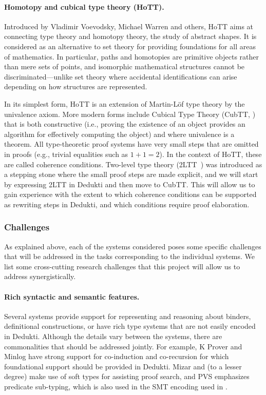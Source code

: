 \paragraph*{Homotopy and cubical type theory (HoTT).}
Introduced by Vladimir Voevodsky, Michael Warren and others, HoTT aims at
connecting type theory and homotopy theory, the study of abstract shapes. It is
considered as an alternative to set theory for providing foundations for all
areas of mathematics. In particular, paths and homotopies are primitive objects
rather than mere sets of points, and isomorphic mathematical structures cannot
be discriminated---unlike set theory where accidental identifications can arise
depending on how structures are represented.

In its simplest form, HoTT is an extension of Martin-L\"of type theory by the
univalence axiom. More modern forms include Cubical Type Theory (CubTT,
\cite{cohen:cubical}) that is both constructive (i.e., proving the existence of
an object provides an algorithm for effectively computing the object) and where
univalence is a theorem. All type-theoretic proof systems have very small steps
that are omitted in proofs (e.g., trivial equalities such as $1+1=2$). In the
context of HoTT, these are called coherence conditions. Two-level type theory
(2LTT~\cite{annenkov:two-level}) was introduced as a stepping stone where the
small proof steps are made explicit, and we will start by expressing 2LTT in
Dedukti and then move to CubTT. This will allow us to gain experience with
the extent to which coherence conditions can be supported as rewriting steps in
Dedukti, and which conditions require proof elaboration.

\subsubsection*{Challenges}

As explained above, each of the systems considered poses some specific
challenges that will be addressed in the tasks corresponding to the
individual systems. We list some cross-cutting research challenges
that this project will allow us to address synergistically.

\paragraph*{Rich syntactic and semantic features.}
Several systems provide support for representing and reasoning about
binders, definitional constructions, or have rich type systems that
are not easily encoded in Dedukti.  Although the details vary between the systems,
there are commonalities that should be addressed jointly. For example,
K Prover and Minlog have strong support for co-induction and co-recursion
for which foundational support should be provided in Dedukti. Mizar
and (to a lesser degree) \tlaplus make use of soft types for assisting
proof search, and PVS emphasizes predicate sub-typing, which is also
used in the SMT encoding used in \tlaplus.

